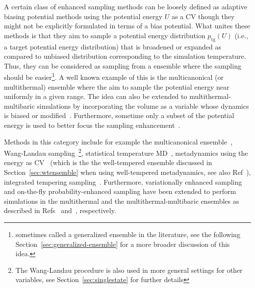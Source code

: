 \documentclass[9pt,review]{livecoms}
\begin{document}
A certain class of enhanced sampling methods can be loosely defined as adaptive biasing potential methods using the potential energy $U$ as a CV though they might not be explicitly formulated in terms of a bias potential. What unites these methods is that they aim to sample a potential energy distribution $p_{\mathrm{tg}}(U)$ (i.e., a target potential energy distribution) that is broadened or expanded as compared to unbiased distribution corresponding to the simulation temperature. Thus, they can be considered as sampling from a ensemble where the sampling should be easier\footnote{sometimes called a generalized ensemble in the literature, see the following Section~\ref{sec:generalized-ensemble} for a more broader discussion of this idea.}. A well known example of this is the multicanonical (or multithermal) ensemble where the aim to sample the potential energy near uniformly in a given range. The idea can also be extended to multithermal-multibaric simulations by incorporating the volume as a variable whose dynamics is biased or modified~\cite{Okumura_MultiTP_2004,Shell_MultiTP_2002}. Furthermore, sometime only a subset of the potential energy is used to better focus the sampling enhancement~\cite{Yang_SITS_2009}.

Methods in this category include for example
the multicanonical ensemble~\cite{Berg1992_Multicanonical},
Wang-Landau sampling~\cite{wang-landau:prl:2001:wang-landau}\footnote{The Wang-Landau procedure is also used in more general settings for other variables, see Section~\ref{sec:singlestate} for further details},
statistical temperature MD~\cite{Kim2006_PRL_STMD},
metadynamics using the energy as CV~\cite{Micheletti_MetaE_Energy_2004,Bonomi-PRL-2010}
(which is the the well-tempered ensemble discussed in Section~\ref{sec:wtensemble} when using well-tempered metadynamics, see also Ref~\cite{Valsson-JCTC-2013}),
integrated tempering sampling~\cite{Gao_ITS_2008,Gao_ITS_Review_2015}.
Furthermore, variationally enhanced sampling and on-the-fly probability-enhanced sampling have been extended to perform simulations in the multithermal and the multithermal-multibaric ensembles as described in Refs~\citep{Piaggi_MultiVES_2019,Piaggi_MultiVES+CV_2019} and~\citep{invernizzi2020unified}, respectively.
\end{document}
